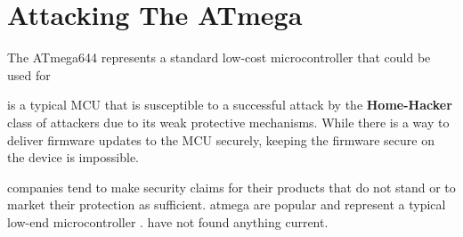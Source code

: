 \section{Attacking The ATmega}
\label{sec:attacking_mega}

The ATmega644 represents a standard low-cost microcontroller that could be used for 

 is a typical MCU that is susceptible to a successful attack by the \textbf{Home-Hacker} class of attackers due to its weak protective mechanisms. While there is a way to deliver firmware updates to the MCU securely\citep{tech:aes_bls}, keeping the firmware secure on the device is impossible.

companies tend to make security claims for their products that do not stand or to market their protection as sufficient\citep{sergei:thesis}. atmega are popular and represent a typical low-end microcontroller \citep{glitches_paper}. have not found anything current. 

